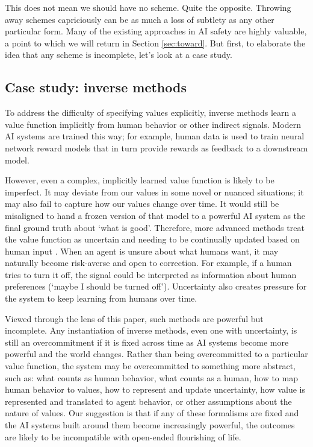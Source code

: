 \documentclass[12pt]{article}
\begin{document}
This does not mean we should have no scheme. Quite the opposite. Throwing away schemes capriciously can be as much a loss of subtlety as any other particular form. Many of the existing approaches in AI safety are highly valuable, a point to which we will return in Section \ref{sec:toward}. But first, to elaborate the idea that any scheme is incomplete, let's look at a case study.


\subsection{Case study: inverse methods}

To address the difficulty of specifying values explicitly, inverse methods learn a value function implicitly from human behavior or other indirect signals. Modern AI systems are trained this way; for example, human data is used to train neural network reward models that in turn provide rewards as feedback to a downstream model.

However, even a complex, implicitly learned value function is likely to be imperfect. It may deviate from our values in some novel or nuanced situations; it may also fail to capture how our values change over time. It would still be misaligned to hand a frozen version of that model to a powerful AI system as the final ground truth about `what is good'. Therefore, more advanced methods treat the value function as uncertain and needing to be continually updated based on human input \citep{russell2019human, hadfieldmenell2017off, hadfieldmenell2016cooperative, shah2020benefits, jeon2020reward}. When an agent is unsure about what humans want, it may naturally become risk-averse and open to correction. For example, if a human tries to turn it off, the signal could be interpreted as information about human preferences (`maybe I should be turned off'). Uncertainty also creates pressure for the system to keep learning from humans over time.

Viewed through the lens of this paper, such methods are powerful but incomplete. Any instantiation of inverse methods, even one with uncertainty, is still an overcommitment if it is fixed across time as AI systems become more powerful and the world changes. Rather than being overcommitted to a particular value function, the system may be overcommitted to something more abstract, such as: what counts as human behavior, what counts as a human, how to map human behavior to values, how to represent and update uncertainty, how value is represented and translated to agent behavior, or other assumptions about the nature of values. Our suggestion is that if any of these formalisms are fixed and the AI systems built around them become increasingly powerful, the outcomes are likely to be incompatible with open-ended flourishing of life.
\end{document}
